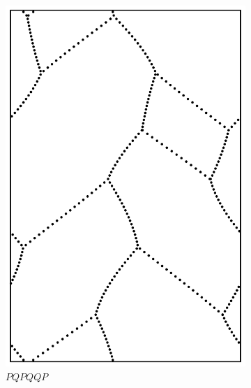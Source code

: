 \documentclass[12pt,twoside]{reedthesis}
\theoremstyle{definition}
\begin{document}
\begin{figure}[h]
\begin{subfigure}[t]{0.24\textwidth}
    \includegraphics[width=\textwidth]{figures/string_cheese_appendix/pqpqqp.pdf}
    \caption*{$PQPQQP$}
    \vspace{5mm}
  \end{subfigure}
  \hfill
  \begin{subfigure}[t]{0.24\textwidth}

\end{subfigure}
\end{figure}
\end{document}
